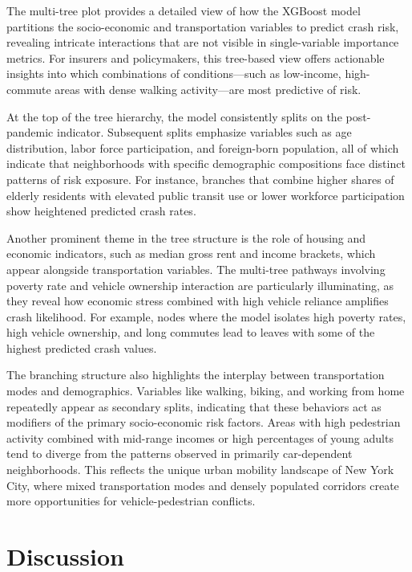 \documentclass[
  number,
  review,
  3p]{elsarticle}
\begin{document}
The multi-tree plot provides a detailed view of how the XGBoost model
partitions the socio-economic and transportation variables to predict
crash risk, revealing intricate interactions that are not visible in
single-variable importance metrics. For insurers and policymakers, this
tree-based view offers actionable insights into which combinations of
conditions---such as low-income, high-commute areas with dense walking
activity---are most predictive of risk.

At the top of the tree hierarchy, the model consistently splits on the
post-pandemic indicator. Subsequent splits emphasize variables such as
age distribution, labor force participation, and foreign-born
population, all of which indicate that neighborhoods with specific
demographic compositions face distinct patterns of risk exposure. For
instance, branches that combine higher shares of elderly residents with
elevated public transit use or lower workforce participation show
heightened predicted crash rates.

Another prominent theme in the tree structure is the role of housing and
economic indicators, such as median gross rent and income brackets,
which appear alongside transportation variables. The multi-tree pathways
involving poverty rate and vehicle ownership interaction are
particularly illuminating, as they reveal how economic stress combined
with high vehicle reliance amplifies crash likelihood. For example,
nodes where the model isolates high poverty rates, high vehicle
ownership, and long commutes lead to leaves with some of the highest
predicted crash values.

The branching structure also highlights the interplay between
transportation modes and demographics. Variables like walking, biking,
and working from home repeatedly appear as secondary splits, indicating
that these behaviors act as modifiers of the primary socio-economic risk
factors. Areas with high pedestrian activity combined with mid-range
incomes or high percentages of young adults tend to diverge from the
patterns observed in primarily car-dependent neighborhoods. This
reflects the unique urban mobility landscape of New York City, where
mixed transportation modes and densely populated corridors create more
opportunities for vehicle-pedestrian conflicts.

\section{Discussion}\label{discussion}
\end{document}
